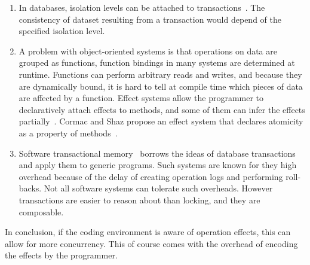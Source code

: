 \documentclass[]{usiinfprospectus}
\begin{document}
\begin{enumerate}
	\item In databases, isolation levels can be attached to transactions~\cite{bernstein2009sql}. The consistency of dataset resulting from a transaction would depend of the specified isolation level. 
	\item A problem with object-oriented systems is that operations on data are grouped as functions, function bindings in many systems are determined at runtime. Functions can perform arbitrary reads and writes, and because they are dynamically bound, it is hard to tell at compile time which pieces of data are affected by a function. Effect systems allow the programmer to  declaratively attach effects to methods, and some of them can infer the effects partially~\cite{marino2009generic}. Cormac and Shaz propose an effect system that declares atomicity as a property of methods~\cite{flanagan2003type}. 
	\item Software transactional memory~\cite{shavit1997software} borrows the ideas of database transactions and apply them to generic programs. Such systems are known for they high overhead because of the delay of creating operation logs and performing roll-backs. Not all software systems can tolerate such overheads. However transactions are easier to reason about than locking, and they are composable.   
\end{enumerate}
	 
In conclusion, if the coding environment is aware of operation effects, this can allow for more concurrency. This of course comes with the overhead of encoding the effects by the programmer. 
\end{document}
